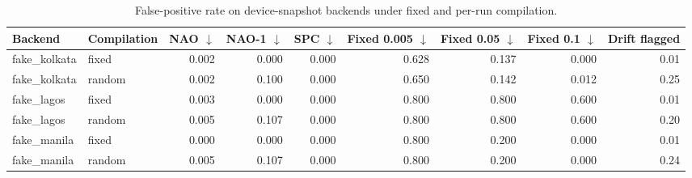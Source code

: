 \begin{table}[t]
\centering
\caption{False-positive rate on device-snapshot backends under fixed and per-run compilation.}
\label{tab:rq1-snapshots}
\small
\begin{tabular}{llrrrrrrr}
\toprule
Backend & Compilation & NAO $\downarrow$ & NAO-1 $\downarrow$ & SPC $\downarrow$ & Fixed 0.005 $\downarrow$ & Fixed 0.05 $\downarrow$ & Fixed 0.1 $\downarrow$ & Drift flagged \\
\midrule
fake\_kolkata & fixed & 0.002 & 0.000 & 0.000 & 0.628 & 0.137 & 0.000 & 0.01 \\
fake\_kolkata & random & 0.002 & 0.100 & 0.000 & 0.650 & 0.142 & 0.012 & 0.25 \\
fake\_lagos & fixed & 0.003 & 0.000 & 0.000 & 0.800 & 0.800 & 0.600 & 0.01 \\
fake\_lagos & random & 0.005 & 0.107 & 0.000 & 0.800 & 0.800 & 0.600 & 0.20 \\
fake\_manila & fixed & 0.000 & 0.000 & 0.000 & 0.800 & 0.200 & 0.000 & 0.01 \\
fake\_manila & random & 0.005 & 0.107 & 0.000 & 0.800 & 0.200 & 0.000 & 0.24 \\
\bottomrule
\end{tabular}
\end{table}

